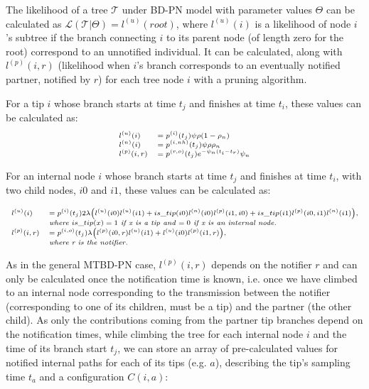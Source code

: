 \documentclass[a4paper,10pt]{article}
\begin{document}
The likelihood of a tree $\mathscr{T}$ under BD-PN model with parameter values $\Theta$ can be calculated as $\mathscr{L}(\mathscr{T}|\Theta) = l^{(u)}(root)$, where $l^{(u)}(i)$ is a likelihood of node $i$'s subtree if the branch connecting $i$ to its parent node (of length zero for the root) correspond to an unnotified individual. It can be calculated, along with $l^{(p)}(i, r)$ (likelihood when $i$'s branch corresponds to an eventually notified partner, notified by $r$) for each tree node $i$ with a pruning algorithm.


For a tip $i$ whose branch starts at time $t_j$ and finishes at time $t_i$, these values can be calculated as:
\begin{equation}
\scriptsize
\begin{array}{ll}
l^{(u)}(i) &= p^{(i)}(t_j)\psi\rho (1-\rho_{n})\\
l^{(n)}(i) &= p^{(i,nh)}(t_j)\psi\rho \rho_{n}\\
l^{(p)}(i, r) &= p^{(r,o)}(t_j)e^{-\psi_n (t_i - t_r)}\psi_{n}\\
\end{array}
\end{equation}

For an internal node $i$ whose branch starts at time $t_j$ and finishes at time $t_i$, with two child nodes, $i0$ and $i1$, these values can be calculated as:

\begin{equation}
\scriptsize
\begin{array}{ll}
l^{(u)}(i) &= p^{(i)}(t_j) 2\lambda 
\Big(l^{(u)}(i0)l^{(u)}(i1) 
+ is\_tip(i0) l^{(n)}(i0)l^{(p)}(i1,i0)
+ is\_tip(i1) l^{(p)}(i0,i1)l^{(n)}(i1)\Big),\\
& \textit{where } is\_tip(x) = 1 \textit{ if x is a tip and $= 0$ if x is an internal node.}\\
l^{(p)}(i, r) &= p^{(i,o)}(t_j) \lambda\Big(l^{(p)}(i0,r)l^{(u)}(i1) + l^{(u)}(i0)l^{(p)}(i1,r)\Big),\\
& \textit{where r is the notifier.}\\
\end{array}
\end{equation}

As in the general MTBD-PN case, $l^{(p)}(i, r)$ depends on the notifier $r$ and can only be calculated once the notification time is known, i.e. once we have climbed to an internal node corresponding to the transmission between the notifier (corresponding to one of its children, must be a tip) and the partner (the other child). As only the contributions coming from the partner tip branches depend on the notification times, while climbing the tree for each internal node $i$ and the time of its branch start $t_j$, we can store an array of pre-calculated values for notified internal paths for each of its tips (e.g. $a$), describing the tip's sampling time $t_a$ and a configuration $C(i,a)$: 
\end{document}
